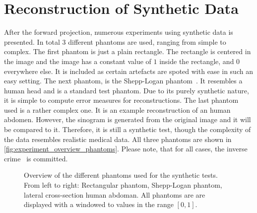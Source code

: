 \section{Reconstruction of Synthetic Data}\label{sec:experiments_synthethic_projection}

After the forward projection, numerous experiments using synthetic data is presented. In total 3
different phantoms are used, ranging from simple to complex. The first phantom is just a plain
rectangle. The rectangle is centered in the image and the image has a constant value of \(1\) inside
the rectangle, and \(0\) everywhere else. It is included as certain artefacts are spoted with ease
in such an easy setting. The next phantom, is the Shepp-Logan phantom~\cite{shepp_fourier_1974}. It
resembles a human head and is a standard test phantom. Due to its purely synthetic nature, it is
simple to compute error measures for reconstructions. The last phantom used is a rather complex one.
It is an example reconstruction of an human abdomen. However, the sinogram is generated from the
original image and it will be compared to it. Therefore, it is still a synthetic test, though the
complexity of the data resembles realistic medical data. All three phantoms are shown in
\autoref{fig:experiment_overview_phantoms}. Please note, that for all cases, the inverse
crime~\cite{wirgin_inverse_2004} is committed.

\begin{figure}[h]
	\centering
	\caption{Overview of the different phantoms used for the synthetic tests. From left to
		right: Rectangular phantom, Shepp-Logan phantom, lateral cross-section human
		abdoman. All phantoms are are displayed with a windowed to values in the range \([0,
				1]\).}\label{fig:experiment_overview_phantoms}
\end{figure}

